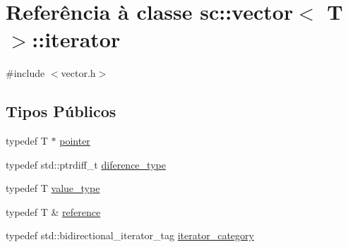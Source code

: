 \hypertarget{classsc_1_1vector_1_1iterator}{}\section{Referência à classe sc\+:\+:vector$<$ T $>$\+:\+:iterator}
\label{classsc_1_1vector_1_1iterator}


{\ttfamily \#include $<$vector.\+h$>$}

\subsection*{Tipos Públicos}
\begin{DoxyCompactItemize}
\item 
typedef T $\ast$ \mbox{\hyperlink{classsc_1_1vector_1_1iterator_a518f02aadbb3fd937bdbda24120d2678}{pointer}}
\item 
typedef std\+::ptrdiff\+\_\+t \mbox{\hyperlink{classsc_1_1vector_1_1iterator_ac395bf1f0c48b965628b90211223d18f}{diference\+\_\+type}}
\item 
typedef T \mbox{\hyperlink{classsc_1_1vector_1_1iterator_acdc3cf870971e4f5f67e3774728583e8}{value\+\_\+type}}
\item 
typedef T \& \mbox{\hyperlink{classsc_1_1vector_1_1iterator_a266d58fdf67f2129ef3dc99efd652e15}{reference}}
\item 
typedef std\+::bidirectional\+\_\+iterator\+\_\+tag \mbox{\hyperlink{classsc_1_1vector_1_1iterator_ac49f578e5b98fd9e58b3d7e13b5d5b53}{iterator\+\_\+category}}
\end{DoxyCompactItemize}
